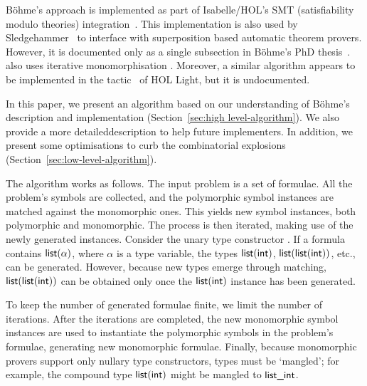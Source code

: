 \documentclass[runningheads]{llncs}
\begin{document}
B\"ohme's approach is implemented as part of Isabelle/HOL's SMT (satisfiability modulo theories) integration~\cite[Chapter 2]{sb-phd}. This implementation is also used by Sledgehammer~\cite{judgement,paulson-blanchette-2010} to interface with superposition based automatic theorem provers. However, it is documented only as a single subsection in B\"ohme's PhD thesis~\cite[Section 2.2.1]{sb-phd}.
 also uses iterative monomorphisation \cite{smt-lib-mono}.
Moreover, a similar algorithm appears to be implemented in the  tactic~\cite{harrison-1996} of HOL Light, but it is undocumented.

In this paper, we present an algorithm based on our understanding of Böhme's description and implementation (Section~\ref{sec:high level-algorithm}). We also provide a more detailed\pagebreak[2] \hbox{description} to help future implementers. In addition, we present some optimisations
to curb the combinatorial explosions (Section~\ref{sec:low-level-algorithm}).

The algorithm works as follows. The input problem is a set of formulae. All the problem's symbols are collected, and the polymorphic symbol instances are matched against the monomorphic ones. This yields new symbol instances, both polymorphic and monomorphic. The process is then iterated, making use of the newly generated instances.
%
Consider the unary type constructor . If a formula contains $\textsf{list}(\alpha)$, where $\alpha$ is a type variable, the types $\textsf{list}(\textsf{int})$, $\textsf{list}(\textsf{list}(\textsf{int}))$, etc., can be generated. However, because new types emerge through matching, $\textsf{list}(\textsf{list}(\textsf{int}))$ can be obtained only once the $\textsf{list}(\textsf{int})$ instance has been generated.

To keep the number of generated formulae finite, we limit the number of iterations. After the iterations are completed, the new monomorphic symbol instances are used to instantiate the polymorphic symbols in the problem's formulae, generating new monomorphic formulae. Finally, because monomorphic provers support only nullary type constructors, types must be `mangled'; for example, the compound type $\textsf{list}(\textsf{int})$ might be mangled to $\textsf{list\_int}$.
\end{document}
